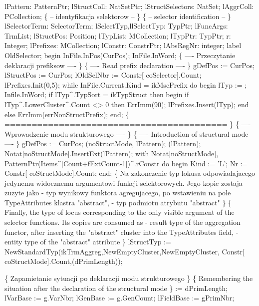   lPattern: PatternPtr;
   lStructColl: NatSetPtr;
   lStructSelectors: NatSet;
   lAggrColl: PCollection;
   \{ -- identyfikacja selektorow -- \} \{ -- selector identification -- \}
   lSelectorTerm: SelectorTerm;
   lSelectTyp,llSelectTyp: TypPtr;
   lFuncArgs: TrmList;
   lStructPos: Position;
   lTypList: MCollection;
   lTypPtr: TypPtr;
   r: Integer;
   lPrefixes: MCollection;
   lConstr: ConstrPtr;
   lAbsRegNr: integer;
label OldSelector;
begin
   InFile.InPos(CurPos); InFile.InWord;
   \{ ---- Przeczytanie deklaracji prefiksow ---- \}
   \{ ---- Read prefix declaration ---- \}
   gDefPos := CurPos;
   lStructPos := CurPos;
   lOldSelNbr :=  Constr[ coSelector].Count;
   lPrefixes.Init(0,5);
   while InFile.Current.Kind = ikMscPrefix do
   begin
      lTyp := ; Infile.InWord;
      if lTyp^.TypSort = ikTypStruct then
      begin
         if lTyp^.LowerCluster^.Count <> 0 then
            ErrImm(90);
         lPrefixes.Insert(lTyp);
      end
      else ErrImm(errNonStructPrefix);
   end;
   \{ ========================================= \}
   \{ ---- Wprowadzenie modu strukturowego ---- \}
   \{ ---- Introduction of structural mode ---- \}
   gDefPos := CurPos;
   (noStructMode, lPattern);
   (lPattern);
   Notat[noStructMode].InsertExt(lPattern);
   with Notat[noStructMode], PatternPtr(Items^[Count+fExtCount-1])^.rConstr do
   begin Kind := 'L'; Nr :=  Constr[ coStructMode].Count; end;
   \{ Na zakonczenie typ lokusa odpowiadajacego jedynemu widocznemu
     argumentowi funkcji selektorowych. Jego kopie zostaja zuzyte
     jako
     - typ wynikowy funktora agregujacego, po wstawieniu na pole
     TypeAttributes klastra "abstract",
     - typ podmiotu atrybutu "abstract"
   \}
   \{ Finally, the type of locus corresponding to the only visible
     argument of the selector functions. Its copies are consumed as
     - result type of the aggregation functor, after inserting the
       "abstract" cluster into the TypeAttributes field,
     - entity type of the "abstract" attribute
   \}
   lStructTyp := NewStandardTyp(ikTrmAggreg,NewEmptyCluster,NewEmptyCluster,
                                Constr[ coStructMode].Count,(dPrimLength));

   \{ Zapamietanie sytuacji po deklaracji modu strukturowego \}
   \{ Remembering the situation after the declaration of the structural mode \}
    := dPrimLength;
   lVarBase := g.VarNbr;
   lGenBase := g.GenCount;
   lFieldBase := gPrimNbr;
   
